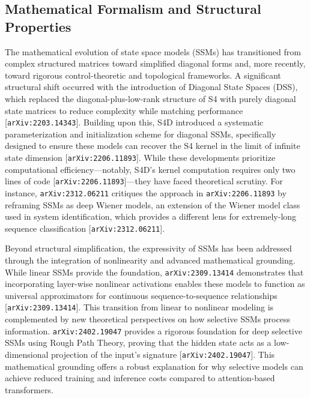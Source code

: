 \documentclass[11pt]{article}
\begin{document}
\subsection{Mathematical Formalism and Structural Properties}

The mathematical evolution of state space models (SSMs) has transitioned from complex structured matrices toward simplified diagonal forms and, more recently, toward rigorous control-theoretic and topological frameworks. A significant structural shift occurred with the introduction of Diagonal State Spaces (DSS), which replaced the diagonal-plus-low-rank structure of S4 with purely diagonal state matrices to reduce complexity while matching performance [\texttt{arXiv:2203.14343}]. Building upon this, S4D introduced a systematic parameterization and initialization scheme for diagonal SSMs, specifically designed to ensure these models can recover the S4 kernel in the limit of infinite state dimension [\texttt{arXiv:2206.11893}]. While these developments prioritize computational efficiency—notably, S4D's kernel computation requires only two lines of code [\texttt{arXiv:2206.11893}]—they have faced theoretical scrutiny. For instance, \texttt{arXiv:2312.06211} critiques the approach in \texttt{arXiv:2206.11893} by reframing SSMs as deep Wiener models, an extension of the Wiener model class used in system identification, which provides a different lens for extremely-long sequence classification [\texttt{arXiv:2312.06211}].

Beyond structural simplification, the expressivity of SSMs has been addressed through the integration of nonlinearity and advanced mathematical grounding. While linear SSMs provide the foundation, \texttt{arXiv:2309.13414} demonstrates that incorporating layer-wise nonlinear activations enables these models to function as universal approximators for continuous sequence-to-sequence relationships [\texttt{arXiv:2309.13414}]. This transition from linear to nonlinear modeling is complemented by new theoretical perspectives on how selective SSMs process information. \texttt{arXiv:2402.19047} provides a rigorous foundation for deep selective SSMs using Rough Path Theory, proving that the hidden state acts as a low-dimensional projection of the input's signature [\texttt{arXiv:2402.19047}]. This mathematical grounding offers a robust explanation for why selective models can achieve reduced training and inference costs compared to attention-based transformers.
\end{document}
